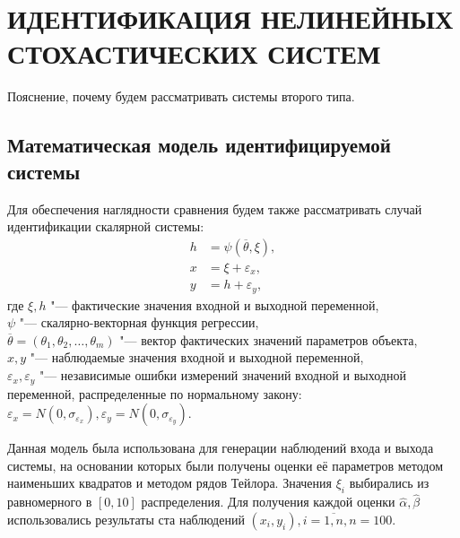 \chapter[Идентификация нелинейных стохастических систем второго типа]{%
  ИДЕНТИФИКАЦИЯ НЕЛИНЕЙНЫХ СТОХАСТИЧЕСКИХ СИСТЕМ
}

{\color{red} Пояснение, почему будем рассматривать системы второго типа.}

\section{Математическая модель идентифицируемой системы}

Для обеспечения наглядности сравнения будем также рассматривать случай
идентификации скалярной системы:
\begin{equation}
  \label{eq:nonlinear_model_scalar}
  \begin{aligned}
    h &= \psi(\overline{\theta}, \xi), \\
    x &= \xi + \varepsilon_x, \\
    y &= h + \varepsilon_y,
  \end{aligned}
\end{equation}
где \( \xi, h \) "--- фактические значения входной и выходной переменной, \\
\hspace*{7mm} \( \psi \) "--- скалярно-векторная функция регрессии, \\
\hspace*{7mm} \( \overline{\theta} = (\theta_1, \theta_2, \dotsc, \theta_m) \)
"--- вектор фактических значений параметров объекта, \\
\hspace*{7mm} \( x, y \) "--- наблюдаемые значения входной и выходной переменной, \\
\hspace*{6mm} \( \varepsilon_x, \varepsilon_y \)
"--- независимые ошибки измерений значений входной и выходной переменной,
распределенные по нормальному закону:
\(
\varepsilon_x = N(0, \sigma_{\varepsilon_x}),
\varepsilon_y = N(0, \sigma_{\varepsilon_y})
\).

Данная модель была использована для генерации наблюдений входа и выхода системы,
на основании которых были получены оценки её параметров
методом наименьших квадратов и методом рядов Тейлора.
Значения \( \xi_i \) выбирались из равномерного в \( [0, 10] \) распределения.
Для получения каждой оценки \( \hat{\alpha}, \hat{\beta} \) использовались результаты
ста наблюдений \( ( x_i, y_i ), i = \overline{1, n}, n = 100 \).

